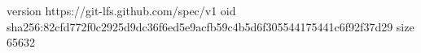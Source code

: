 version https://git-lfs.github.com/spec/v1
oid sha256:82cfd772f0c2925d9dc36f6ed5e9acfb59c4b5d6f305544175441c6f92f37d29
size 65632
